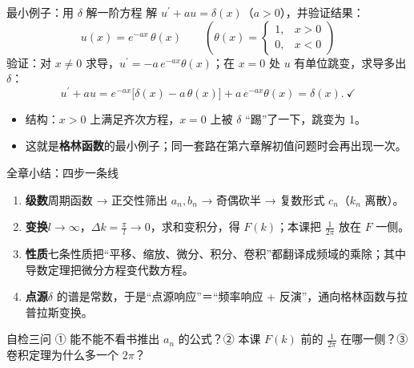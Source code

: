 \documentclass[aspectratio=169,10pt]{beamer}
\newcommand{\bstrong}[1]{{\color{deep}\bfseries #1}}
\newcommand{\bhl}[1]{{\color{mid}\bfseries #1}}
\begin{document}
\begin{frame}{最小例子：用 $\delta$ 解一阶方程}
  {\small 解 $u^{\prime}+au=\delta(x)$（$a>0$），并验证结果：}
  \[
    u(x)=e^{-ax}\,\theta(x)
    \qquad\left(\theta(x)=\begin{cases}1,&x>0\\0,&x<0\end{cases}\right)
  \]
  {\small 验证：对 $x\neq0$ 求导，$u^{\prime}=-a\,e^{-ax}\theta(x)$；在 $x=0$ 处 $u$ 有单位跳变，求导多出 $\delta$：}
  \[
    u^{\prime}+au=e^{-ax}\big[\delta(x)-a\,\theta(x)\big]+a\,e^{-ax}\theta(x)=\delta(x).\ \checkmark
  \]
  \begin{itemize}\small
    \item 结构：$x>0$ 上满足齐次方程，$x=0$ 上被 $\delta$ “踢”了一下，跳变为 1。
    \item 这就是\bhl{格林函数}的最小例子；同一套路在第六章解初值问题时会再出现一次。
  \end{itemize}
\end{frame}

\begin{frame}{全章小结：四步一条线}
  \begin{enumerate}\small
    \item \bstrong{级数}\quad 周期函数 → 正交性筛出 $a_n,b_n$ → 奇偶砍半 → 复数形式 $c_n$（$k_n$ 离散）。
    \item \bstrong{变换}\quad $l\to\infty$，$\Delta k=\frac{\pi}{l}\to0$，求和变积分，得 $F(k)$；本课把 $\frac{1}{2\pi}$ 放在 $F$ 一侧。
    \item \bstrong{性质}\quad 七条性质把“平移、缩放、微分、积分、卷积”都翻译成频域的乘除；其中导数定理把微分方程变代数方程。
    \item \bstrong{点源}\quad $\delta$ 的谱是常数，于是“点源响应”＝“频率响应 + 反演”，通向格林函数与拉普拉斯变换。
  \end{enumerate}
  \vspace{6pt}
  \begin{block}{自检三问}
    \small ① 能不能不看书推出 $a_n$ 的公式？② 本课 $F(k)$ 前的 $\frac{1}{2\pi}$ 在哪一侧？③ 卷积定理为什么多一个 $2\pi$？
  \end{block}
\end{frame}
\end{document}
